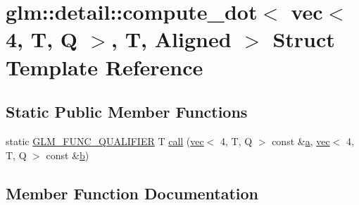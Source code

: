\hypertarget{structglm_1_1detail_1_1compute__dot_3_01vec_3_014_00_01_t_00_01_q_01_4_00_01_t_00_01_aligned_01_4}{}\section{glm\+:\+:detail\+:\+:compute\+\_\+dot$<$ vec$<$ 4, T, Q $>$, T, Aligned $>$ Struct Template Reference}
\label{structglm_1_1detail_1_1compute__dot_3_01vec_3_014_00_01_t_00_01_q_01_4_00_01_t_00_01_aligned_01_4}
\subsection*{Static Public Member Functions}
\begin{DoxyCompactItemize}
\item 
static \hyperlink{setup_8hpp_a33fdea6f91c5f834105f7415e2a64407}{G\+L\+M\+\_\+\+F\+U\+N\+C\+\_\+\+Q\+U\+A\+L\+I\+F\+I\+ER} T \hyperlink{structglm_1_1detail_1_1compute__dot_3_01vec_3_014_00_01_t_00_01_q_01_4_00_01_t_00_01_aligned_01_4_a960387a4cb95a1a796219b05f263d021}{call} (\hyperlink{structglm_1_1vec}{vec}$<$ 4, T, Q $>$ const \&\hyperlink{_s_d_l__opengl__glext_8h_a3309789fc188587d666cda5ece79cf82}{a}, \hyperlink{structglm_1_1vec}{vec}$<$ 4, T, Q $>$ const \&\hyperlink{_s_d_l__opengl__glext_8h_a0f71581a41fd2264c8944126dabbd010}{b})
\end{DoxyCompactItemize}


\subsection{Member Function Documentation}
\mbox{\label{structglm_1_1detail_1_1compute__dot_3_01vec_3_014_00_01_t_00_01_q_01_4_00_01_t_00_01_aligned_01_4_a960387a4cb95a1a796219b05f263d021}} 
